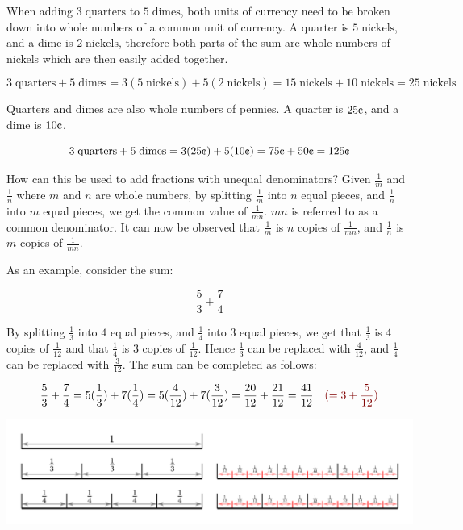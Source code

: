 \documentclass{article}
\newcommand{\dr}[1]{\textcolor{dark_red}{#1}}
\begin{document}
When adding \(3 \; \text{quarters}\) to \(5 \; \text{dimes}\), both units of currency need to be broken down into whole numbers of a common unit of currency. A quarter is \(5 \; \text{nickels}\), and a dime is \(2 \; \text{nickels}\), therefore both parts of the sum are whole numbers of nickels which are then easily added together. 

\[3 \; \text{quarters} + 5 \; \text{dimes} = 3 (5 \; \text{nickels}) + 5 (2 \; \text{nickels}) = 15 \; \text{nickels} + 10 \; \text{nickels} = 25 \; \text{nickels}\]

Quarters and dimes are also whole numbers of pennies. A quarter is \(25\text{\textcent}\), and a dime is \(10\text{\textcent}\).

\[3 \; \text{quarters} + 5 \; \text{dimes} = 3 (25\text{\textcent}) + 5 (10\text{\textcent}) = 75\text{\textcent} + 50\text{\textcent} = 125\text{\textcent}\]


How can this be used to add fractions with unequal denominators? Given \(\frac{1}{m}\) and \(\frac{1}{n}\) where \(m\) and \(n\) are whole numbers, by splitting \(\frac{1}{m}\) into \(n\) equal pieces, and \(\frac{1}{n}\) into \(m\) equal pieces, we get the common value of \(\frac{1}{mn}\). \(mn\) is referred to as a common denominator. It can now be observed that \(\frac{1}{m}\) is \(n\) copies of \(\frac{1}{mn}\), and \(\frac{1}{n}\) is \(m\) copies of \(\frac{1}{mn}\).

As an example, consider the sum:

\[\frac{5}{3} + \frac{7}{4}\]

By splitting \(\frac{1}{3}\) into \(4\) equal pieces, and \(\frac{1}{4}\) into \(3\) equal pieces, we get that \(\frac{1}{3}\) is \(4\) copies of \(\frac{1}{12}\) and that \(\frac{1}{4}\) is \(3\) copies of \(\frac{1}{12}\). Hence \(\frac{1}{3}\) can be replaced with \(\frac{4}{12}\), and \(\frac{1}{4}\) can be replaced with \(\frac{3}{12}\). The sum can be completed as follows: 

\[\frac{5}{3} + \frac{7}{4} = 5(\frac{1}{3}) + 7(\frac{1}{4}) = 5(\frac{4}{12}) + 7(\frac{3}{12}) = \frac{20}{12} + \frac{21}{12} = \frac{41}{12} \quad\dr{( = 3 + \frac{5}{12})}\]

\includegraphics[width = \textwidth]{adding_fractions}
\end{document}
